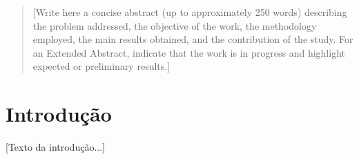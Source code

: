 \documentclass[sigconf, nonacm, screen, language=portuguese, language=spanish, language={main=english}]{acmart}             %
\begin{document}
\begin{abstract}
[Write here a concise abstract (up to approximately 250 words)
describing the problem addressed, the objective of the work, the
methodology employed, the main results obtained, and the
contribution of the study. For an Extended Abstract, indicate that
the work is in progress and highlight expected or preliminary
results.]
\end{abstract}

\keywords{[Keyword 1], [Keyword 2], [Keyword 3], [Keyword 4]}

\maketitle


\section{Introdução}
[Texto da introdução...]


\end{document}
